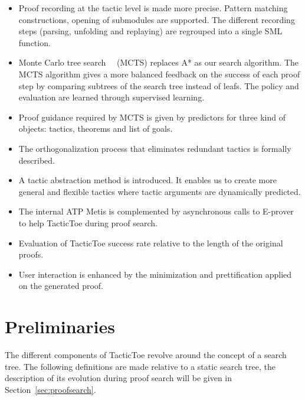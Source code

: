 \documentclass[runningheads,a4paper,draft]{svjour3}
\newcommand{\todoi}[1]{\todo[inline]{#1}}
\def\eprover{\textsf{E-prover}\xspace}
\def\sml{\textsf{SML}\xspace}
\def\metis{\textsf{Metis}\xspace}
\def\tactictoe{\textsf{TacticToe}\xspace}
\begin{document}
\begin{itemize}
\item Proof recording at the tactic level is made more precise. Pattern
matching constructions, opening of submodules are supported. The different
recording steps (parsing, unfolding and replaying) are regrouped into a single
\sml function.
\item Monte Carlo tree search~~\cite{montecarlo} (MCTS) replaces A* as our
search algorithm. The MCTS algorithm gives a more balanced feedback on
the success of
each proof step by
comparing subtrees of the search tree instead of leafs. The policy and
evaluation are learned
through supervised learning.
\item Proof guidance required by MCTS is given by predictors for
three kind of objects: tactics, theorems and list of goals.
\item The orthogonalization process that eliminates redundant tactics is
formally described.
\item A tactic abstraction method is introduced. It enables us to create
more general and flexible tactics where tactic arguments are dynamically
predicted.
\item The internal ATP \metis is complemented
by asynchronous calls to \eprover to help \tactictoe during proof search.
\todoi{More on evaluation??}
\item Evaluation of \tactictoe success rate relative to
the length of the original proofs.
\item User interaction is enhanced by the minimization and prettification
applied on the generated proof.
\end{itemize}


\section{Preliminaries}\label{sec:prelim}

The different components of \tactictoe revolve around the concept of a
search tree. The following definitions are made relative to a static search
tree, the description of its evolution during proof search will be given in
Section~\ref{sec:proofsearch}.
\end{document}
